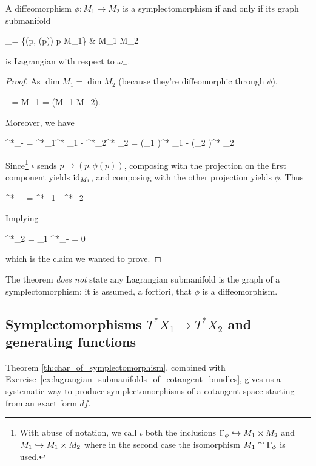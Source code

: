 \documentclass[main.tex]{subfiles}
\begin{document}
\begin{theorem}
\label{th:char_of_symplectomorphism}
	A diffeomorphism $\phi : M_1 \to M_2$ is a symplectomorphism if and only if its graph submanifold
	\begin{diagram}
		\Gamma_\phi = \{(p, \phi(p)) \suchthat p \in M_1\}  \& M_1 \times M_2
	\end{diagram}
	is Lagrangian with respect to $\omega_-$.
\end{theorem}
\begin{proof}
	As $\dim M_1 = \dim M_2$ (because they're diffeomorphic through $\phi$),
	\begin{eqalign}
		\dim \Gamma_\phi = \dim M_1 =  \dim (M_1 \times M_2).
	\end{eqalign}
	Moreover, we have
	\begin{eqalign}
		\iota^*\omega_- = \iota^*\pr_1^* \omega_1 - \iota^*\pr_2^* \omega_2 = (\pr_1 \circ \iota)^* \omega_1 - (\pr_2 \circ \iota)^* \omega_2
	\end{eqalign}
	Since\footnote{With abuse of notation, we call $\iota$ both the inclusions $\Gamma_\phi \hookrightarrow M_1 \times M_2$ and $M_1 \hookrightarrow M_1 \times M_2$ where in the second case the isomorphism $M_1 \overset{}{\cong} \Gamma_\phi$ is used. } $\iota$ sends $p \mapsto (p,\phi(p))$, composing with the projection on the first component yields $\mathrm{id}_{M_1}$, and composing with the other projection yields $\phi$. Thus
	\begin{eqalign}
		\iota^*\omega_- = \id^*\omega_1 - \phi^*\omega_2
	\end{eqalign}
	Implying
	\begin{eqalign}
		\phi^*\omega_2 = \omega_1 \iff \iota^*\omega_- = 0
	\end{eqalign}
	which is the claim we wanted to prove.
\end{proof}

\begin{remark}
	The theorem \emph{does not} state any Lagrangian submanifold is the graph of a symplectomorphism: it is assumed, a fortiori, that $\phi$ is a diffeomorphism.
\end{remark}

\subsection{Symplectomorphisms $T^*X_1 \to T^*X_2$ and generating functions}
Theorem \ref{th:char_of_symplectomorphism}, combined with Exercise~\ref{ex:lagrangian_submanifolds_of_cotangent_bundles}, gives us a systematic way to produce symplectomorphisms of a cotangent space starting from an exact form $df$.
\end{document}
